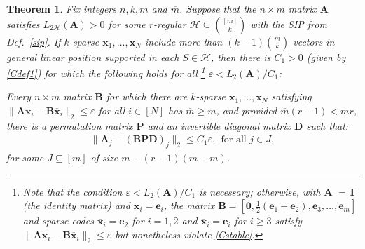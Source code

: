 \documentclass[journal, twocolumn]{IEEEtran}
\newtheorem{theorem}{Theorem}
\begin{document}
\begin{theorem}\label{DeterministicUniquenessTheorem}
Fix integers $n, k, m$ and $\overline m$. Suppose that the $n \times m$ matrix $\mathbf{A}$ satisfies $L_{2\mathcal{H}}(\mathbf{A}) > 0$ for some $r$-regular $\mathcal{H} \subseteq {[m] \choose k}$ with the SIP from Def.~\ref{sip}. If $k$-sparse \mbox{$\mathbf{x}_1, \ldots, \mathbf{x}_N$} include more than $(k-1){\overline m \choose k}$ vectors in general linear position supported in each $S \in \mathcal{H}$, then there is $C_1 > 0$ (given by \eqref{Cdef1}) for which the following holds for all%
\footnote{Note that the condition $\varepsilon < L_2(\mathbf{A}) /C_1$ is necessary; otherwise, with \mbox{$\mathbf{A}$ = $\mathbf{I}$} (the identity matrix) and $\mathbf{x}_i = \mathbf{e}_i$, the matrix $\mathbf{B} = \left[\mathbf{0}, \frac{1}{2}(\mathbf{e}_1 + \mathbf{e}_2), \mathbf{e}_3, \ldots, \mathbf{e}_{m} \right]$ and sparse codes $\mathbf{\overline x}_i = \mathbf{e}_2$ for $i = 1, 2$ and $\mathbf{\overline x}_i = \mathbf{e}_i$ for $i \geq 3$ satisfy $\|\mathbf{A}\mathbf{x}_i - \mathbf{B}\mathbf{\overline{x}}_i \|_2 \leq \varepsilon$ but nonetheless violate \eqref{Cstable}.} $\varepsilon < L_{2}(\mathbf{A}) / C_1$:

Every $n \times \overline m$ matrix $\mathbf{B}$ for which there are $k$-sparse $\mathbf{\overline x}_1, \ldots, \mathbf{\overline x}_N$ satisfying \mbox{$\|\mathbf{A}\mathbf{x}_i - \mathbf{B}\mathbf{\overline x}_i\|_2 \leq \varepsilon$} for all $i \in [N]$ has $\overline m \geq m$, and provided $\overline m (r-1) < mr$, there is a permutation matrix $\mathbf{P}$ and an invertible diagonal matrix $\mathbf{D}$ such that:
\begin{align}\label{Cstable}
\|\mathbf{A}_j- (\mathbf{BPD})_j\|_2 \leq C_1 \varepsilon, \ \ \text{for all } j \in J,
\end{align}
%
for some $J \subseteq [m]$ of size \mbox{$m - (r-1)(\overline m - m)$}. 


\end{theorem}
\end{document}
